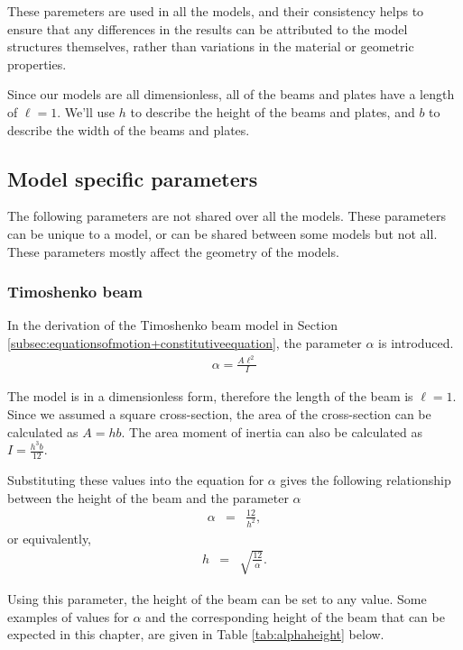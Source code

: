 \documentclass[../../main.tex]{subfiles}
\begin{document}
These paremeters are used in all the models, and their consistency helps to ensure that any differences in the results can be attributed to the model structures themselves, rather than variations in the material or geometric properties.

Since our models are all dimensionless, all of the beams and plates have a length of $\ell = 1$. We'll use $h$ to describe the height of the beams and plates, and $b$ to describe the width of the beams and plates.

\subsection{Model specific parameters}
The following parameters are not shared over all the models. These parameters can be unique to a model, or can be shared between some models but not all. These parameters mostly affect the geometry of the models.

\subsubsection{Timoshenko beam}
In the derivation of the Timoshenko beam model in Section \ref{subsec:equationsofmotion+constitutiveequation}, the parameter $\alpha$ is introduced.
\begin{eqnarray*}
	\alpha = \frac{A\ell^2}{I}
\end{eqnarray*}

The model is in a dimensionless form, therefore the length of the beam is $\ell = 1$. Since we assumed a square cross-section, the area of the cross-section can be calculated as $\displaystyle A = hb$. The area moment of inertia can also be calculated as $\displaystyle I = \frac{h^3b}{12}$.

Substituting these values into the equation for $\alpha$ gives the following relationship between the height of the beam and the parameter $\alpha$
\begin{eqnarray*}
	\alpha & = & \frac{12}{h^2},
\end{eqnarray*}
or equivalently,
\begin{eqnarray*}
	h & = & \sqrt{\frac{12}{\alpha}}.
\end{eqnarray*}

Using this parameter, the height of the beam can be set to any value. Some examples of values for $\alpha$ and the corresponding height of the beam that can be expected in this chapter, are given in Table \ref{tab:alphaheight} below.
\end{document}

